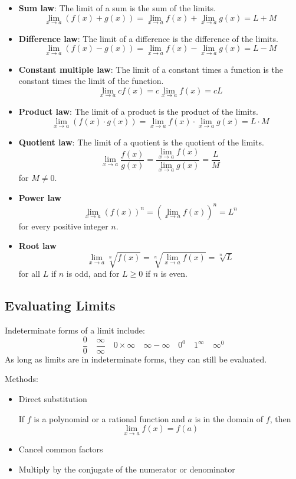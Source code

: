 \begin{itemize}
\item \textbf{Sum law}: The limit of a sum is the sum of the limits.
\[ \lim_{x\to a}(f(x)+g(x)) = \lim_{x\to a}f(x) + \lim_{x\to a}g(x) = L+M \]

\item \textbf{Difference law}: The limit of a difference is the difference of the limits.
\[ \lim_{x\to a}(f(x)-g(x)) = \lim_{x\to a}f(x) - \lim_{x\to a}g(x) = L-M \]

\item \textbf{Constant multiple law}: The limit of a constant times a function is the constant times the limit of the function.
\[ \lim_{x\to a}cf(x) = c\lim_{x\to a}f(x) = cL \]

\item \textbf{Product law}: The limit of a product is the product of the limits.
\[ \lim_{x\to a}(f(x)\cdot g(x)) = \lim_{x\to a}f(x) \cdot \lim_{x\to a}g(x) = L\cdot M \]

\item \textbf{Quotient law}: The limit of a quotient is the quotient of the limits.
\[ \lim_{x\to a}\frac{f(x)}{g(x)} = \frac{\lim_{x\to a}f(x)}{\lim_{x\to a}g(x)} = \frac{L}{M} \]
for $M \neq 0$.

\item \textbf{Power law}
\[ \lim_{x\to a}(f(x))^n = (\lim_{x\to a}f(x))^n = L^n \]
for every positive integer $n$.

\item \textbf{Root law}
\[ \lim_{x\to a}\sqrt[n]{f(x)} = \sqrt[n]{\lim_{x\to a}f(x)} = \sqrt[n]{L} \]
for all $L$ if $n$ is odd, and for $L\ge 0$ if $n$ is even.
\end{itemize}
\pagebreak

\subsection{Evaluating Limits}
Indeterminate forms of a limit include:
\[ \frac{0}{0} \quad \frac{\infty}{\infty} \quad 0 \times \infty \quad \infty - \infty \quad 0^0 \quad 1^{\infty} \quad \infty^0 \]
As long as limits are in indeterminate forms, they can still be evaluated.

Methods:
\begin{itemize}
\item Direct substitution

If $f$ is a polynomial or a rational function and $a$ is in the domain of $f$, then
\[ \lim_{x\to a}f(x)=f(a) \]

\item Cancel common factors
\item Multiply by the conjugate of the numerator or denominator
\end{itemize}

